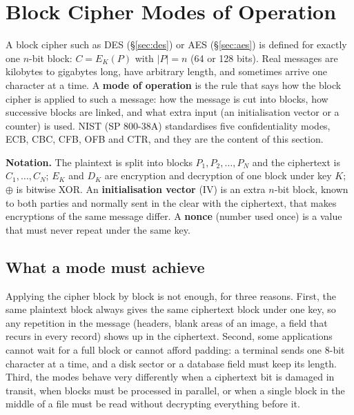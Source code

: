 \section{Block Cipher Modes of Operation}\label{sec:modes}

A block cipher such as DES (\S\ref{sec:des}) or AES (\S\ref{sec:aes}) is defined for exactly one $n$-bit block: $C = E_K(P)$ with $|P| = n$ (64 or 128 bits). Real messages are kilobytes to gigabytes long, have arbitrary length, and sometimes arrive one character at a time. A \textbf{mode of operation} is the rule that says how the block cipher is applied to such a message: how the message is cut into blocks, how successive blocks are linked, and what extra input (an initialisation vector or a counter) is used. NIST (SP 800-38A) standardises five confidentiality modes, ECB, CBC, CFB, OFB and CTR, and they are the content of this section.

\textbf{Notation.} The plaintext is split into blocks $P_1, P_2, \dots, P_N$ and the ciphertext is $C_1, \dots, C_N$; $E_K$ and $D_K$ are encryption and decryption of one block under key $K$; $\oplus$ is bitwise XOR. An \textbf{initialisation vector} (IV) is an extra $n$-bit block, known to both parties and normally sent in the clear with the ciphertext, that makes encryptions of the same message differ. A \textbf{nonce} (number used once) is a value that must never repeat under the same key.

\subsection{What a mode must achieve \new}

Applying the cipher block by block is not enough, for three reasons. First, the same plaintext block always gives the same ciphertext block under one key, so any repetition in the message (headers, blank areas of an image, a field that recurs in every record) shows up in the ciphertext. Second, some applications cannot wait for a full block or cannot afford padding: a terminal sends one 8-bit character at a time, and a disk sector or a database field must keep its length. Third, the modes behave very differently when a ciphertext bit is damaged in transit, when blocks must be processed in parallel, or when a single block in the middle of a file must be read without decrypting everything before it.

